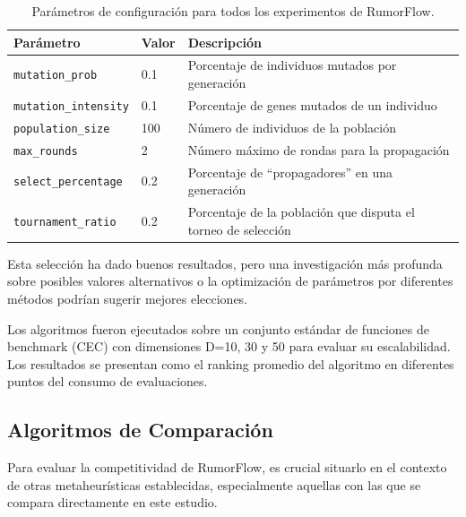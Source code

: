 \documentclass[11pt,a4paper]{article}
\begin{document}
\begin{table}[h!]
\centering
\caption{Parámetros de configuración para todos los experimentos de RumorFlow.}
\label{tab:parametros}
\begin{tabularx}{\textwidth}{l l >{\raggedright\arraybackslash}X}
\toprule
\textbf{Parámetro} & \textbf{Valor} & \textbf{Descripción} \\
\midrule
\texttt{mutation\_prob} & 0.1 & Porcentaje de individuos mutados por generación \\
\texttt{mutation\_intensity} & 0.1 & Porcentaje de genes mutados de un individuo \\
\texttt{population\_size} & 100 & Número de individuos de la población \\
\texttt{max\_rounds} & 2 & Número máximo de rondas para la propagación \\
\texttt{select\_percentage} & 0.2 & Porcentaje de “propagadores” en una generación \\
\texttt{tournament\_ratio} & 0.2 & Porcentaje de la población que disputa el torneo de selección \\
\bottomrule
\end{tabularx}
\end{table}

Esta selección ha dado buenos resultados, pero una investigación más profunda sobre posibles valores alternativos o 
la optimización de parámetros por diferentes métodos podrían sugerir mejores elecciones.


Los algoritmos fueron ejecutados sobre un conjunto estándar de funciones de benchmark (CEC) con dimensiones D=10, 30 y 50 para evaluar su escalabilidad. Los resultados se presentan como el ranking promedio del algoritmo en diferentes puntos del consumo de evaluaciones.

\subsection{Algoritmos de Comparación}
Para evaluar la competitividad de RumorFlow, es crucial situarlo en el 
contexto de otras metaheurísticas establecidas, especialmente aquellas 
con las que se compara directamente en este estudio.
\end{document}
